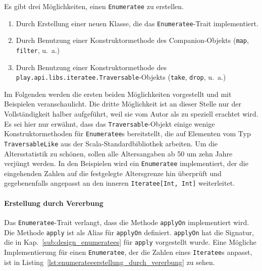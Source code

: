 Es gibt drei Möglichkeiten, einen \lstinline|Enumeratee| zu erstellen.

\begin{enumerate}
  \item Durch Erstellung einer neuen Klasse, die das \lstinline|Enumeratee|-Trait implementiert.
  \item Durch Benutzung einer Konstruktormethode des Companion-Objekts (\lstinline|map|, \lstinline|filter|, u.~a.)
  \item Durch Benutzung einer Konstruktormethode des \lstinline|play.api.libs.iteratee.Traversable|-Objekts (\lstinline|take|, \lstinline|drop|, u.~a.)
\end{enumerate}

Im Folgenden werden die ersten beiden Möglichkeiten vorgestellt und mit Beispielen veranschaulicht.
Die dritte Möglichkeit ist an dieser Stelle nur der Vollständigkeit halber aufgeführt, weil sie vom Autor als zu speziell erachtet wird.
Es sei hier nur erwähnt, dass das \lstinline|Traversable|-Objekt einige wenige Konstruktormethoden für \lstinline|Enumeratee|s bereitstellt, die auf Elementen vom Typ \lstinline|TraversableLike| aus der Scala-Standardbibliothek arbeiten.
Um die Altersstatistik zu schönen, sollen alle Altersangaben ab 50 um zehn Jahre verjüngt werden.
In den Beispielen wird ein \lstinline|Enumeratee| implementiert, der die eingehenden Zahlen auf die festgelegte Altersgrenze hin überprüft und gegebenenfalls angepasst an den inneren \lstinline|Iteratee[Int, Int]| weiterleitet.

\paragraph{Erstellung durch Vererbung} %
\label{par:enumerateeerstellung_durch_vererbung}\mbox{} %

Das \lstinline|Enumeratee|-Trait verlangt, dass die Methode \lstinline|applyOn| implementiert wird.
Die Methode \lstinline|apply| ist als Alias für \lstinline|applyOn| definiert.
\lstinline|applyOn| hat die Signatur, die in Kap.~\ref{sub:design_enumeratees} für \lstinline|apply| vorgestellt wurde.
Eine Mögliche Implementierung für einen \lstinline|Enumeratee|, der die Zahlen eines \lstinline|Iteratee|s anpasst, ist in Listing~\ref{lst:enumerateeerstellung_durch_vererbung} zu sehen.

